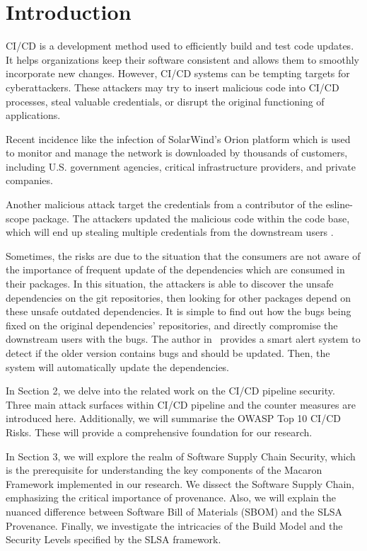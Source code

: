 \section{Introduction}
CI/CD is a development method used to efficiently build and test code updates. 
It helps organizations keep their software consistent and allows them to smoothly 
incorporate new changes. However, CI/CD systems can be tempting targets for cyberattackers. 
These attackers may try to insert malicious code into CI/CD processes, 
steal valuable credentials, or disrupt the original functioning of applications.

Recent incidence like the infection of SolarWind's Orion platform \cite{ladisa2023sok, 
peisert2021perspectives} which is used to monitor and manage the network is downloaded by 
thousands of customers, including U.S. government agencies, critical infrastructure providers, 
and private companies. 

Another malicious attack target the credentials from a contributor of the esline-scope package.
The attackers updated the malicious code within the code base, which will end up stealing
multiple credentials from the downstream users \cite{eslint2018}.

Sometimes, the risks are due to the situation that the consumers are not aware of the importance 
of frequent update of the dependencies which are consumed in their packages. In this situation,
the attackers is able to discover the unsafe dependencies on the git repositories, then looking for
other packages depend on these unsafe outdated dependencies. It is simple to find out how the bugs being
fixed on the original dependencies' repositories, and directly compromise the downstream users with the bugs.
The author in~\cite{wang2020empirical} provides a smart alert system to detect if the older version contains
bugs and should be updated. Then, the system will automatically update the dependencies.

In Section 2, we delve into the related work on the CI/CD pipeline security. Three main 
attack surfaces within CI/CD pipeline and the counter measures are introduced here. 
Additionally, we will summarise the OWASP Top 10 CI/CD Risks. These will provide a comprehensive
foundation for our research. 

In Section 3, we will explore the realm of Software Supply Chain Security, which is the prerequisite
for understanding the key components of the Macaron Framework implemented in our research.
We dissect the Software Supply Chain, emphasizing the critical importance of provenance. 
Also, we will explain the nuanced difference between Software Bill of Materials (SBOM) and the SLSA Provenance.
Finally, we investigate the intricacies of the Build Model and the Security Levels specified by the SLSA framework.

